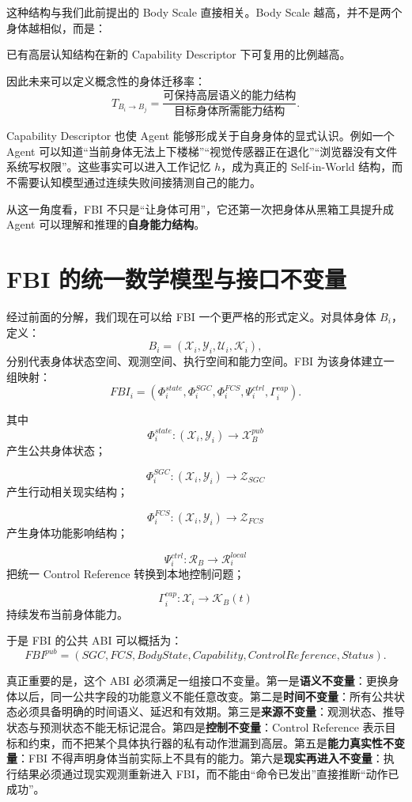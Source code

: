 这种结构与我们此前提出的 Body Scale 直接相关。Body Scale 越高，并不是两个身体越相似，而是：
\begin{statementbox}
已有高层认知结构在新的 Capability Descriptor 下可复用的比例越高。
\end{statementbox}
因此未来可以定义概念性的身体迁移率：
\[
T_{B_i\rightarrow B_j}
=
\frac{
\text{可保持高层语义的能力结构}
}{
\text{目标身体所需能力结构}
}.
\]

Capability Descriptor 也使 Agent 能够形成关于自身身体的显式认识。例如一个 Agent 可以知道“当前身体无法上下楼梯”“视觉传感器正在退化”“浏览器没有文件系统写权限”。这些事实可以进入工作记忆 \(h\)，成为真正的 Self-in-World 结构，而不需要认知模型通过连续失败间接猜测自己的能力。

从这一角度看，FBI 不只是“让身体可用”，它还第一次把身体从黑箱工具提升成 Agent 可以理解和推理的\textbf{自身能力结构}。


\section{FBI 的统一数学模型与接口不变量}

经过前面的分解，我们现在可以给 FBI 一个更严格的形式定义。对具体身体 \(B_i\)，定义：
\[
B_i
=
(
\mathcal X_i,
\mathcal Y_i,
\mathcal U_i,
\mathcal K_i
),
\]
分别代表身体状态空间、观测空间、执行空间和能力空间。FBI 为该身体建立一组映射：
\[
FBI_i
=
(
\Phi_i^{state},
\Phi_i^{SGC},
\Phi_i^{FCS},
\Psi_i^{ctrl},
\Gamma_i^{cap}
).
\]

其中
\[
\Phi_i^{state}:
(\mathcal X_i,\mathcal Y_i)
\rightarrow
\mathcal X_B^{pub}
\]
产生公共身体状态；

\[
\Phi_i^{SGC}:
(\mathcal X_i,\mathcal Y_i)
\rightarrow
\mathcal Z_{SGC}
\]
产生行动相关现实结构；

\[
\Phi_i^{FCS}:
(\mathcal X_i,\mathcal Y_i)
\rightarrow
\mathcal Z_{FCS}
\]
产生身体功能影响结构；

\[
\Psi_i^{ctrl}:
\mathcal R_B
\rightarrow
\mathcal R_i^{local}
\]
把统一 Control Reference 转换到本地控制问题；

\[
\Gamma_i^{cap}:
\mathcal X_i
\rightarrow
\mathcal K_B(t)
\]
持续发布当前身体能力。

于是 FBI 的公共 ABI 可以概括为：
\[
\boxed{
FBI^{pub}
=
(
SGC,
FCS,
BodyState,
Capability,
ControlReference,
Status
).
}
\]

真正重要的是，这个 ABI 必须满足一组接口不变量。第一是\textbf{语义不变量}：更换身体以后，同一公共字段的功能意义不能任意改变。第二是\textbf{时间不变量}：所有公共状态必须具备明确的时间语义、延迟和有效期。第三是\textbf{来源不变量}：观测状态、推导状态与预测状态不能无标记混合。第四是\textbf{控制不变量}：Control Reference 表示目标和约束，而不把某个具体执行器的私有动作泄漏到高层。第五是\textbf{能力真实性不变量}：FBI 不得声明身体当前实际上不具有的能力。第六是\textbf{现实再进入不变量}：执行结果必须通过现实观测重新进入 FBI，而不能由“命令已发出”直接推断“动作已成功”。

